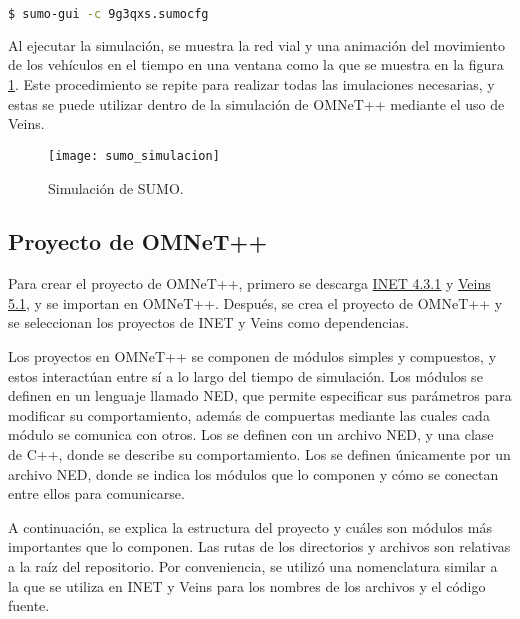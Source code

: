 \begin{lstlisting}[language=bash]
$ sumo-gui -c 9g3qxs.sumocfg
\end{lstlisting}

Al ejecutar la simulación, se muestra la red vial y una animación del
movimiento de los vehículos en el tiempo en una ventana como la que se muestra
en la figura \ref{fig:sumo_simulacion}. Este procedimiento se repite para
realizar todas las imulaciones necesarias, y estas se puede utilizar dentro de
la simulación de OMNeT++ mediante el uso de Veins.

\begin{figure}[th!]
\centering
\texttt{[image: sumo\_simulacion]}
\decoRule
\caption[Simulación de SUMO]{Simulación de SUMO.}
\label{fig:sumo_simulacion}
\end{figure}

\subsection{Proyecto de OMNeT++}
\label{subsec:proyecto_omnet}

Para crear el proyecto de OMNeT++, primero se descarga
\href{https://inet.omnetpp.org/Download.html}{INET 4.3.1} y
\href{https://veins.car2x.org/download/}{Veins 5.1}, y se importan en OMNeT++.
Después, se crea el proyecto de OMNeT++ y se seleccionan los proyectos de INET y
Veins como dependencias.

Los proyectos en OMNeT++ se componen de módulos simples y compuestos, y estos
interactúan entre sí a lo largo del tiempo de simulación. Los módulos se definen
en un lenguaje llamado NED, que permite especificar sus parámetros para
modificar su comportamiento, además de compuertas mediante las cuales cada
módulo se comunica con otros. Los  se definen con un
archivo NED, y una clase de C++, donde se describe su comportamiento. Los
 se definen únicamente por un archivo NED, donde se
indica los módulos que lo componen y cómo se conectan entre ellos para
comunicarse.

A continuación, se explica la estructura del proyecto y cuáles son módulos más
importantes que lo componen. Las rutas de los directorios y archivos son
relativas a la raíz del repositorio. Por conveniencia, se utilizó una
nomenclatura similar a la que se utiliza en INET y Veins para los nombres de
los archivos y el código fuente.


